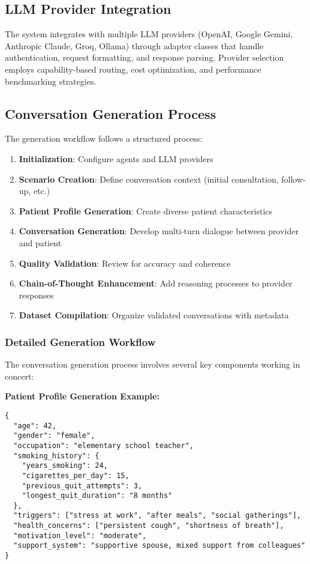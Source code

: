\subsection{LLM Provider Integration}

The system integrates with multiple LLM providers (OpenAI, Google Gemini, Anthropic Claude, Groq, Ollama) through adapter classes that handle authentication, request formatting, and response parsing. Provider selection employs capability-based routing, cost optimization, and performance benchmarking strategies.

\subsection{Conversation Generation Process}

The generation workflow follows a structured process:

\begin{enumerate}
    \item \textbf{Initialization}: Configure agents and LLM providers
    \item \textbf{Scenario Creation}: Define conversation context (initial consultation, follow-up, etc.)
    \item \textbf{Patient Profile Generation}: Create diverse patient characteristics
    \item \textbf{Conversation Generation}: Develop multi-turn dialogue between provider and patient
    \item \textbf{Quality Validation}: Review for accuracy and coherence
    \item \textbf{Chain-of-Thought Enhancement}: Add reasoning processes to provider responses
    \item \textbf{Dataset Compilation}: Organize validated conversations with metadata
\end{enumerate}

\subsubsection{Detailed Generation Workflow}

The conversation generation process involves several key components working in concert:

\begin{mdframed}[linecolor=black, linewidth=1pt, backgroundcolor=gray!5, roundcorner=10pt, innerleftmargin=10pt, innerrightmargin=10pt]
\textbf{Patient Profile Generation Example:}
\scriptsize
\begin{verbatim}
{
  "age": 42,
  "gender": "female",
  "occupation": "elementary school teacher",
  "smoking_history": {
    "years_smoking": 24,
    "cigarettes_per_day": 15,
    "previous_quit_attempts": 3,
    "longest_quit_duration": "8 months"
  },
  "triggers": ["stress at work", "after meals", "social gatherings"],
  "health_concerns": ["persistent cough", "shortness of breath"],
  "motivation_level": "moderate",
  "support_system": "supportive spouse, mixed support from colleagues"
}
\end{verbatim}
\normalsize
\end{mdframed}

